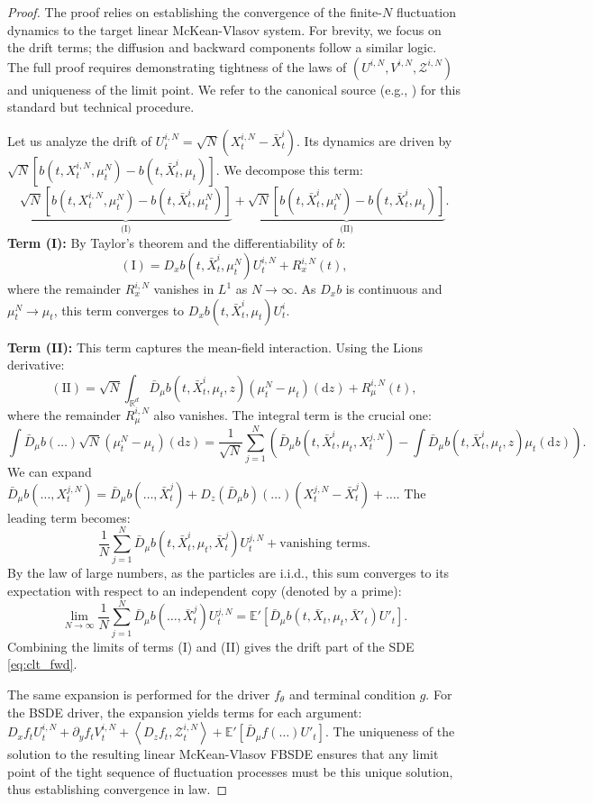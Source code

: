 \documentclass[qian]{imsart}
\newcommand{\R}{\mathbb{R}}
\newcommand{\E}{\mathbb{E}}
\newcommand{\dd}{\mathrm{d}}
\newcommand{\scpr}[2]{\left\langle #1, #2 \right\rangle}
\theoremstyle{plain}
\theoremstyle{definition}
\begin{document}
\begin{proof}
The proof relies on establishing the convergence of the finite-$N$ fluctuation dynamics to the target linear McKean-Vlasov system. For brevity, we focus on the drift terms; the diffusion and backward components follow a similar logic. The full proof requires demonstrating tightness of the laws of $(U^{i,N}, V^{i,N}, \mathcal{Z}^{i,N})$ and uniqueness of the limit point. We refer to the canonical source (e.g., \cite{CarmonaDelarue2018}) for this standard but technical procedure.

Let us analyze the drift of $U^{i,N}_t = \sqrt{N}(X^{i,N}_t - \bar{X}^i_t)$. Its dynamics are driven by $\sqrt{N}[b(t, X^{i,N}_t, \mu^N_t) - b(t, \bar{X}^i_t, \mu_t)]$. We decompose this term:
\[ \underbrace{\sqrt{N} [b(t, X^{i,N}_t, \mu^N_t) - b(t, \bar{X}^i_t, \mu^N_t)]}_{\text{(I)}} + \underbrace{\sqrt{N} [b(t, \bar{X}^i_t, \mu^N_t) - b(t, \bar{X}^i_t, \mu_t)]}_{\text{(II)}}. \]
\textbf{Term (I):} By Taylor's theorem and the differentiability of $b$:
\[ (\text{I}) = D_x b(t, \bar{X}^i_t, \mu^N_t) U^{i,N}_t + R_x^{i,N}(t), \]
where the remainder $R_x^{i,N}$ vanishes in $L^1$ as $N \to \infty$. As $D_x b$ is continuous and $\mu^N_t \to \mu_t$, this term converges to $D_x b(t, \bar{X}^i_t, \mu_t) U^{i}_t$.

\textbf{Term (II):} This term captures the mean-field interaction. Using the Lions derivative:
\[ (\text{II}) = \sqrt{N} \int_{\R^d} \bar{D}_\mu b(t, \bar{X}^i_t, \mu_t, z) (\mu^N_t - \mu_t)(\dd z) + R_\mu^{i,N}(t), \]
where the remainder $R_\mu^{i,N}$ also vanishes. The integral term is the crucial one:
\[ \int \bar{D}_\mu b(\dots) \sqrt{N}(\mu^N_t - \mu_t)(\dd z) = \frac{1}{\sqrt{N}} \sum_{j=1}^N \left( \bar{D}_\mu b(t, \bar{X}^i_t, \mu_t, X^{j,N}_t) - \int \bar{D}_\mu b(t, \bar{X}^i_t, \mu_t, z)\mu_t(\dd z) \right). \]
We can expand $\bar{D}_\mu b(\dots, X^{j,N}_t) = \bar{D}_\mu b(\dots, \bar{X}^j_t) + D_z(\bar{D}_\mu b)(\dots) (X^{j,N}_t - \bar{X}^j_t) + \dots$. The leading term becomes:
\[ \frac{1}{N} \sum_{j=1}^N \bar{D}_\mu b(t, \bar{X}^i_t, \mu_t, \bar{X}^j_t) U^{j,N}_t + \text{vanishing terms}. \]
By the law of large numbers, as the particles are i.i.d., this sum converges to its expectation with respect to an independent copy (denoted by a prime):
\[ \lim_{N\to\infty} \frac{1}{N} \sum_{j=1}^N \bar{D}_\mu b(\dots, \bar{X}^j_t) U^{j,N}_t = \E'\left[ \bar{D}_\mu b(t, \bar{X}_t, \mu_t, \bar{X}'_t) U'_t \right]. \]
Combining the limits of terms (I) and (II) gives the drift part of the SDE \eqref{eq:clt_fwd}.

The same expansion is performed for the driver $f_\theta$ and terminal condition $g$. For the BSDE driver, the expansion yields terms for each argument:
$D_x f_t U^{i,N}_t + \partial_y f_t V^{i,N}_t + \scpr{D_z f_t}{\mathcal{Z}^{i,N}_t} + \E'[\bar{D}_\mu f(\dots)U'_t]$. The uniqueness of the solution to the resulting linear McKean-Vlasov FBSDE ensures that any limit point of the tight sequence of fluctuation processes must be this unique solution, thus establishing convergence in law.
\end{proof}
\end{document}
